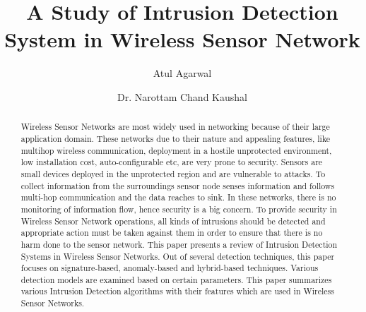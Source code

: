 \documentclass{svproc}
\begin{document}
\mainmatter              %
%
\title{A Study of Intrusion Detection System in
Wireless Sensor Network}
%
%
\author{Atul Agarwal \and Dr. Narottam Chand Kaushal}
%
%
%

\maketitle              %

\begin{abstract}
Wireless Sensor Networks are most widely used in networking because of their large application domain. These networks due to their nature and appealing features, like multihop wireless communication, deployment in a hostile unprotected environment, low installation cost, auto-configurable etc, are very prone to security. Sensors are small devices deployed in the unprotected region and are vulnerable to attacks. To collect information from the surroundings sensor node senses information and follows multi-hop communication and the data reaches to sink. In these networks, there is no monitoring of information flow, hence security is a big concern. To provide security in Wireless Sensor Network operations, all kinds of intrusions should be detected and appropriate action must be taken against them in order to ensure that there is no harm done to the sensor network. This paper presents a review of Intrusion Detection Systems in Wireless Sensor Networks. Out of several detection techniques, this paper focuses on signature-based, anomaly-based and hybrid-based techniques. Various detection models are examined based on certain parameters. This paper summarizes various Intrusion Detection algorithms with their features which are used in Wireless Sensor Networks.
\end{abstract}
%
\end{document}
